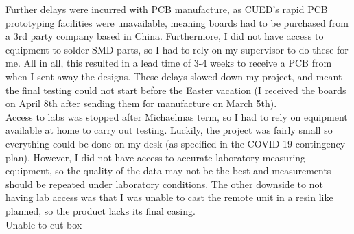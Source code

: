Further delays were incurred with PCB manufacture, as CUED's rapid PCB prototyping facilities were unavailable, meaning boards had to be purchased from a 3rd party company based in China. Furthermore, I did not have access to equipment to solder SMD parts, so I had to rely on my supervisor to do these for me. All in all, this resulted in a lead time of 3-4 weeks to receive a PCB from when I sent away the designs. These delays slowed down my project, and meant the final testing could not start before the Easter vacation (I received the boards on April 8th after sending them for manufacture on March 5th).\\

Access to labs was stopped after Michaelmas term, so I had to rely on equipment available at home to carry out testing. Luckily, the project was fairly small so everything could be done on my desk (as specified in the COVID-19 contingency plan). However, I did not have access to accurate laboratory measuring equipment, so the quality of the data may not be the best and measurements should be repeated under laboratory conditions. The other downside to not having lab access was that I was unable to cast the remote unit in a resin like planned, so the product lacks its final casing.\\




Unable to cut box